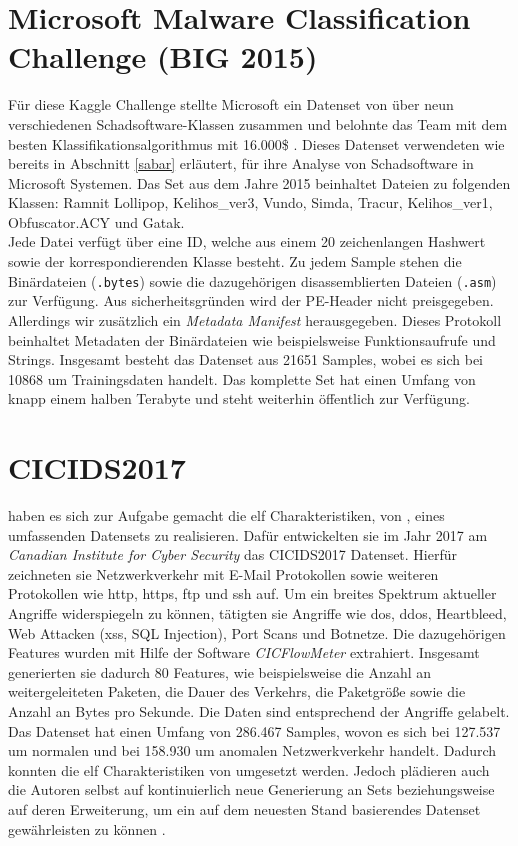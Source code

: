 \documentclass[
    12pt, %
    DIV10,
    ngerman, %
    a4paper, %
    oneside, %
    titlepage, %
    parskip=half, %
    headings=normal, %
    listof=totoc, %
    bibliography=totoc, %
    index=totoc, %
    captions=tableheading, %
    final %
]{scrreprt}
\begin{document}
\section{Microsoft Malware Classification Challenge (BIG 2015)}
Für diese Kaggle Challenge stellte Microsoft ein Datenset von über neun verschiedenen Schadsoftware-Klassen zusammen und belohnte das Team mit dem besten Klassifikationsalgorithmus mit 16.000\$ \parencite{Kaggle}. Dieses Datenset verwendeten wie bereits in Abschnitt \ref{sabar} erläutert, \textcite{Sabar2018} für ihre Analyse von Schadsoftware in Microsoft Systemen.
Das Set aus dem Jahre 2015 beinhaltet Dateien zu folgenden Klassen: Ramnit
Lollipop, Kelihos\_ver3, Vundo, Simda, Tracur, Kelihos\_ver1, Obfuscator.ACY und Gatak.\\Jede Datei verfügt über eine ID, welche aus einem 20 zeichenlangen Hashwert sowie der korrespondierenden Klasse besteht. Zu jedem Sample stehen die Binärdateien (\texttt{.bytes}) sowie die dazugehörigen disassemblierten Dateien (\texttt{.asm}) zur Verfügung. Aus sicherheitsgründen wird der PE-Header nicht preisgegeben. Allerdings wir zusätzlich ein \emph{Metadata Manifest} herausgegeben. Dieses Protokoll beinhaltet Metadaten der Binärdateien wie beispielsweise Funktionsaufrufe und Strings.
Insgesamt besteht das Datenset aus 21651 Samples, wobei es sich bei 10868 um Trainingsdaten handelt. Das komplette Set hat einen Umfang von knapp einem halben Terabyte und steht weiterhin öffentlich zur Verfügung.
\section{CICIDS2017}
\textcite{Sharafaldin2018} haben es sich zur Aufgabe gemacht die elf Charakteristiken, von \textcite{7885840}, eines umfassenden Datensets zu realisieren. Dafür entwickelten sie im Jahr 2017 am \emph{Canadian Institute for Cyber Security} das CICIDS2017 Datenset. Hierfür zeichneten sie Netzwerkverkehr mit E-Mail Protokollen sowie weiteren Protokollen wie \ac{http}, \ac{https}, \ac{ftp} und \ac{ssh} auf. Um ein breites Spektrum aktueller Angriffe widerspiegeln zu können, tätigten sie Angriffe wie \ac{dos}, \ac{ddos}, Heartbleed, Web Attacken (\ac{xss}, SQL Injection), Port Scans und Botnetze. Die dazugehörigen Features wurden mit Hilfe der Software \emph{CICFlowMeter} \parencite{Lashkari201} extrahiert. Insgesamt generierten sie dadurch 80 Features, wie beispielsweise die Anzahl an weitergeleiteten Paketen, die Dauer des Verkehrs, die Paketgrö{\ss}e sowie die Anzahl an Bytes pro Sekunde.
Die Daten sind entsprechend der Angriffe gelabelt. Das Datenset hat einen Umfang von 286.467 Samples, wovon es sich bei 127.537 um normalen und bei 158.930 um anomalen Netzwerkverkehr handelt. Dadurch konnten die elf Charakteristiken von \textcite{7885840} umgesetzt werden. Jedoch plädieren auch die Autoren selbst auf kontinuierlich neue Generierung an Sets beziehungsweise auf deren Erweiterung, um ein auf dem neuesten Stand basierendes Datenset gewährleisten zu können \parencite{Sharafaldin2018}.
\end{document}

